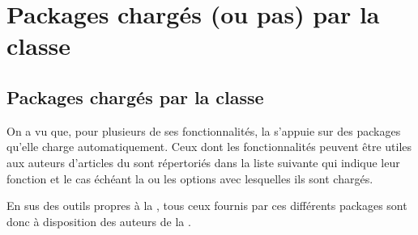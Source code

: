 \documentclass[french,nolocaltoc]{nwejmart}
\newtheorem[style=definition]{fait}
\newtheorem[title=contraventionnalisation]{ctrv}
\newtheorem[title-plural=anneaux]{anneau}
\newtheorem[title-plural=idéaux]{idéal}
\begin{document}
\section{Packages chargés (ou pas) par la
  classe}\label{sec-packages-charges-ou-pas}

\subsection{Packages chargés par la classe}\label{sec:packages-charges-par}

On a vu que, pour plusieurs de ses fonctionnalités, la \nwejmauthorcl{} s'appuie
sur des packages qu'elle charge automatiquement. Ceux dont les fonctionnalités
peuvent être utiles aux auteurs d'articles du \nwejm{} sont répertoriés dans la
liste suivante qui indique leur fonction et le cas échéant la ou les options
avec lesquelles ils sont chargés.

En sus des outils propres à la \nwejmauthorcl, tous ceux fournis par ces
différents packages sont donc à disposition des auteurs de la \nwejm{}.
\end{document}
